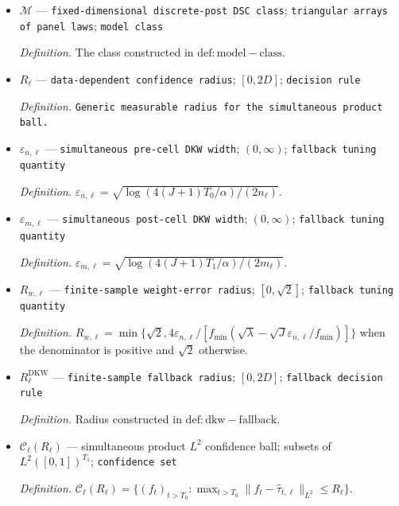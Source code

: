 \documentclass{article}
\begin{document}
\begin{itemize}
  \par\smallskip\noindent\emph{Definition.} \texttt{Requested deterministic half-\allowbreak{}width of a certified cutoff bracket.}
  \item \(\mathcal M\) --- \texttt{fixed-\allowbreak{}dimensional discrete-\allowbreak{}post DSC class}; \texttt{triangular arrays of panel laws}; \texttt{model class}
  \par\smallskip\noindent\emph{Definition.} The class constructed in \(\mathrm{def:model-class}\).
  \item \(R_\ell\) --- \texttt{data-\allowbreak{}dependent confidence radius}; \([0,2D]\); \texttt{decision rule}
  \par\smallskip\noindent\emph{Definition.} \texttt{Generic measurable radius for the simultaneous product ball.}
  \item \(\varepsilon_{n,\ell}\) --- \texttt{simultaneous pre-\allowbreak{}cell DKW width}; \((0,\infty)\); \texttt{fallback tuning quantity}
  \par\smallskip\noindent\emph{Definition.} \(\varepsilon_{n,\ell}=\sqrt{\log(4(J+1)T_0/\alpha)/(2n_\ell)}\).
  \item \(\varepsilon_{m,\ell}\) --- \texttt{simultaneous post-\allowbreak{}cell DKW width}; \((0,\infty)\); \texttt{fallback tuning quantity}
  \par\smallskip\noindent\emph{Definition.} \(\varepsilon_{m,\ell}=\sqrt{\log(4(J+1)T_1/\alpha)/(2m_\ell)}\).
  \item \(R_{w,\ell}\) --- \texttt{finite-\allowbreak{}sample weight-\allowbreak{}error radius}; \([0,\sqrt2]\); \texttt{fallback tuning quantity}
  \par\smallskip\noindent\emph{Definition.} \(R_{w,\ell}=\min\{\sqrt2,4\varepsilon_{n,\ell}/[f_{\min}(\sqrt\lambda-\sqrt J\varepsilon_{n,\ell}/f_{\min})]\}\) when the denominator is positive and \(\sqrt2\) otherwise.
  \item \(R^{\mathrm{DKW}}_\ell\) --- \texttt{finite-\allowbreak{}sample fallback radius}; \([0,2D]\); \texttt{fallback decision rule}
  \par\smallskip\noindent\emph{Definition.} Radius constructed in \(\mathrm{def:dkw-fallback}\).
  \item \(\mathcal C_\ell(R_\ell)\) --- simultaneous product \(L^2\) confidence ball; subsets of \(L^2([0,1])^{T_1}\); \texttt{confidence set}
  \par\smallskip\noindent\emph{Definition.} \(\mathcal C_\ell(R_\ell)=\{(f_t)_{t>T_0}:\max_{t>T_0}\|f_t-\widehat\tau_{t,\ell}\|_{L^2}\leq R_\ell\}\).

\end{itemize}
\end{document}
